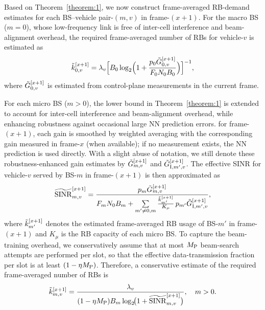 \documentclass[10pt,journal,letterpaper]{journal_template/IEEEtran}
\newcommand{\rev}[1]{\textcolor{revisioncolor}{{}#1}}
\newif\ifshowdeletions
\newcommand{\currentdel}[1]{\ifshowdeletions\textcolor{deletioncolor}{\sout{#1}}\fi}
\theoremstyle{remark}
\begin{document}
Based on Theorem~\ref{theorem:1}, we now construct frame-averaged RB-demand estimates for each BS–vehicle pair-$(m,v)$ in frame-$(x\!+\!1)$.
For the macro BS ($m=0$), whose low-frequency link is free of inter-cell interference and beam-alignment overhead, the required frame-averaged number of RBs for vehicle-$v$ is estimated as 
\begin{equation}
\label{eq:RB_demand_hat_macro}
    \Tilde{k}_{0,v}^{[x+1]}
    = \lambda_v
      \Bigl[
        B_0 \log_2 \Bigl(
        1 + \frac{ p_0 \Tilde{G}_{0,v}^{[x+1]}}{F_0 N_0 B_0}
        \Bigr)
      \Bigr]^{-1},
\end{equation}
where $\Tilde{G}_{0,v}^{[x+1]}$ is estimated from control-plane measurements in the current frame.

For each micro BS ($m>0$), the lower bound in Theorem~\ref{theorem:1} is extended to account for inter-cell interference and beam-alignment overhead, while enhancing robustness against occasional large NN prediction errors. \currentdel{Given the NN-predicted frame-averaged gains} for frame-$(x\!+\!1)$, each gain is smoothed by weighted averaging with the corresponding gain measured in frame-$x$ (when available); if no measurement exists, the NN prediction is used directly. With a slight abuse of notation, we still denote these robustness-enhanced gain estimates by $\Tilde{G}_{m,v}^{[x+1]}$ and $\Tilde{G}_{{\rm I},m',v}^{[x+1]}$. The effective SINR for vehicle-$v$ served by BS-$m$ in frame-$(x\!+\!1)$ is then approximated as
\begin{equation}
\label{eq:eff_SINR_hat}
    \widetilde{\mathrm{SINR}}_{m,v}^{[x+1]}
    = \frac{p_m \Tilde{G}_{m,v}^{[x+1]}}
           {F_m N_0 B_m
            + \sum\limits_{m'\neq 0,m}
              \frac{\Tilde{k}_{m'}^{[x+1]}}{K_\mu}\, p_{m'} \Tilde{G}_{{\rm I},m',v}^{[x+1]}},
\end{equation}
where $\Tilde{k}_{m'}^{[x+1]}$ denotes the estimated frame-averaged RB usage of BS-$m'$ in frame-$(x\!+\!1)$ and $K_\mu$ is the RB capacity of each micro BS. To capture the beam-training overhead, we conservatively assume that at most $M_{\rm P}$ beam-search attempts are performed per slot, so that the effective data-transmission fraction per slot is\rev{ at least} $(1-\eta M_{\rm P})$. Therefore, a conservative estimate of the required frame-averaged number of RBs is
\begin{equation}
\label{eq:RB_demand_hat}
    \Tilde{k}_{m,v}^{[x+1]}
    = \frac{\lambda_v}{(1-\eta M_{\rm P}) B_m \log_2\!\bigl(1+\widetilde{\mathrm{SINR}}_{m,v}^{[x+1]}\bigr)},
    \quad m>0.
\end{equation}
\end{document}
